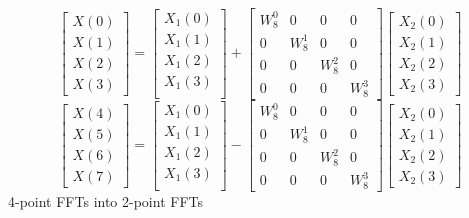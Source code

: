 \documentclass[journal,12pt,twocolumn]{IEEEtran}
\numberwithin{equation}{section}
\renewcommand\thesection{\arabic{section}}
\begin{document}
\begin{enumerate}[label=\arabic*.,ref=\thesection.\theenumi]
\begin{equation}
\begin{bmatrix}
X(0) \\ 
X(1) \\ 
X(2) \\ 
X(3)
\end{bmatrix}
=
\begin{bmatrix}
X_{1}(0) \\ 
X_{1}(1)\\ 
X_{1}(2)\\
X_{1}(3)\\
\end{bmatrix}
+
\begin{bmatrix}
W^{0}_{8} & 0 & 0 & 0\\
0 & W^{1}_{8} & 0 & 0\\
0 & 0 & W^{2}_{8} & 0\\
0 & 0 & 0 & W^{3}_{8}
\end{bmatrix}
\begin{bmatrix}
X_{2}(0) \\ 
X_{2}(1) \\ 
X_{2}(2) \\
X_{2}(3)
\end{bmatrix}
\label{8to4_1}
\end{equation}
\begin{equation}
\begin{bmatrix}
X(4) \\ 
X(5) \\ 
X(6) \\ 
X(7)
\end{bmatrix}
=
\begin{bmatrix}
X_{1}(0) \\ 
X_{1}(1)\\ 
X_{1}(2)\\
X_{1}(3)\\
\end{bmatrix}
-
\begin{bmatrix}
W^{0}_{8} & 0 & 0 & 0\\
0 & W^{1}_{8} & 0 & 0\\
0 & 0 & W^{2}_{8} & 0\\
0 & 0 & 0 & W^{3}_{8}
\end{bmatrix}
\begin{bmatrix}
X_{2}(0) \\ 
X_{2}(1) \\ 
X_{2}(2) \\
X_{2}(3)
\end{bmatrix}
\label{8to4_2}
\end{equation}
4-point FFTs into 2-point FFTs
\begin{equation}

\end{equation}
\end{enumerate}
\end{document}
